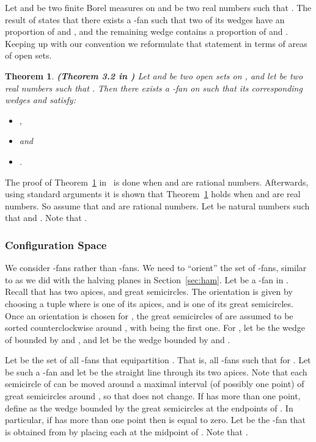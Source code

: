 \documentclass{article}
\newtheorem{theorem}{Theorem}
\begin{document}
Let  and  be two finite Borel measures on  and
 be two real numbers such that . 
The result of \cite{equivariant} states that there exists
a -fan such that two of its wedges have an  proportion
of  and , and the remaining wedge contains a 
proportion of  and .  Keeping up with our convention we reformulate 
that statement in terms of areas of open sets. 

\begin{theorem}\label{thm:fan}\textbf{(Theorem 3.2 in \cite{equivariant})}
Let  and  be two open sets on , and let
 be two real numbers such that . 
Then there exists a -fan on  such that its corresponding
wedges  and  satisfy:
\begin{itemize}

\item ,
\item  and
\item .
\end{itemize}
\end{theorem}

The proof of Theorem~\ref{thm:fan} in~\cite{equivariant} is done 
when  and  are rational numbers. Afterwards, using standard
arguments it is shown that Theorem~\ref{thm:fan} holds when  and  
are real numbers. So assume that  and  are rational numbers.
Let  be natural numbers
such that  and . Note that
. 


\subsubsection*{Configuration Space}

We consider -fans rather than -fans. 
We need to ``orient'' the set of -fans, similar to as 
we did with the halving planes in Section~\ref{sec:ham}.
Let  be a -fan in .  Recall that 
has two apices, and  great semicircles. The orientation is given 
by choosing a tuple  where  is one of its apices, and  is 
one of its great semicircles.
 Once an orientation  is chosen for ,
the  great semicircles  of  are assumed to 
be sorted counterclockwise around , with  being the first
one. For , let  be the wedge of  
bounded by  and , and let  be the wedge bounded by
 and .

Let  be the set of all -fans that equipartition . 
That is, all -fans  such that
 for .
Let  be such a -fan and let  be the straight line
through its two apices. Note that each semicircle
 of  can be moved around a maximal interval  (of possibly one point) of great semicircles around ,
so that  does not change. If  has more than one point, define  as the wedge bounded
by the great semicircles at
the endpoints of . In particular, if  has more than one point then  is equal to zero.
Let  be the -fan that is obtained from  by placing each  at the midpoint
of . Note that . 
\end{document}
